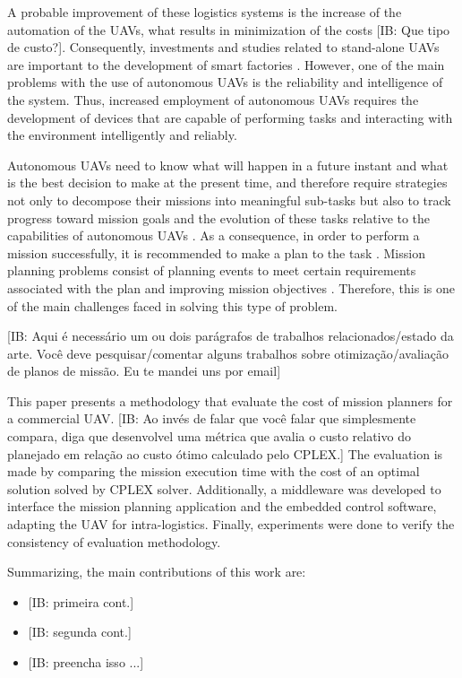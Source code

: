\documentclass[conference,harvard,brazil,english]{sbatex}
\newcommand{\commentib}[1]{{\color{blue} [IB: #1]}}
\begin{document}
A probable improvement of these logistics systems is the increase of the automation of the UAVs, what results in minimization of the costs \commentib{Que tipo de custo?}. Consequently, investments and studies related to stand-alone UAVs are important to the development of smart factories \cite{hern2014dhl}. However, one of the main problems with the use of autonomous UAVs is the reliability and intelligence of the system. Thus, increased employment of autonomous UAVs requires the development of devices that are capable of performing tasks and interacting with the environment intelligently and reliably.

Autonomous UAVs need to know what will happen in a future instant and what is the best decision to make at the present time, and therefore require strategies not only to decompose their missions into meaningful sub-tasks but also to track progress toward mission goals and the evolution of these tasks relative to the capabilities of autonomous UAVs \cite{finn2012developments}. As a consequence, in order to perform a mission successfully, it is recommended to make a plan to the task \cite{successplan}. Mission planning problems consist of planning events to meet certain requirements associated with the plan and improving mission objectives \cite{krozel1988search}. Therefore, this is one of the main challenges faced in solving this type of problem.

\commentib{Aqui \'e necess\'ario um ou dois par\'agrafos de trabalhos relacionados/estado da arte. Voc\^e deve pesquisar/comentar alguns trabalhos sobre otimiza\c{c}\~ao/avalia\c{c}\~ao de planos de miss\~ao.  Eu te mandei uns por email}

This paper presents a methodology that evaluate the cost of mission planners for a commercial UAV. \commentib{Ao inv\'es de falar que voc\^e falar que simplesmente compara, diga que desenvolvel uma m\'etrica que avalia o custo relativo do planejado em rela\c{c}\~ao ao custo \'otimo calculado pelo CPLEX.} The evaluation is made by comparing the mission execution time with the cost of an optimal solution solved by CPLEX solver. Additionally, a middleware was developed to interface the mission planning application and the embedded control software, adapting the UAV for intra-logistics. Finally, experiments were done to verify the consistency of evaluation methodology.

Summarizing, the main contributions of this work are:
\begin{itemize}
\item \commentib{primeira cont.}
\item \commentib{segunda cont.}
\item \commentib{preencha isso ...}
\end{itemize}
\end{document}
